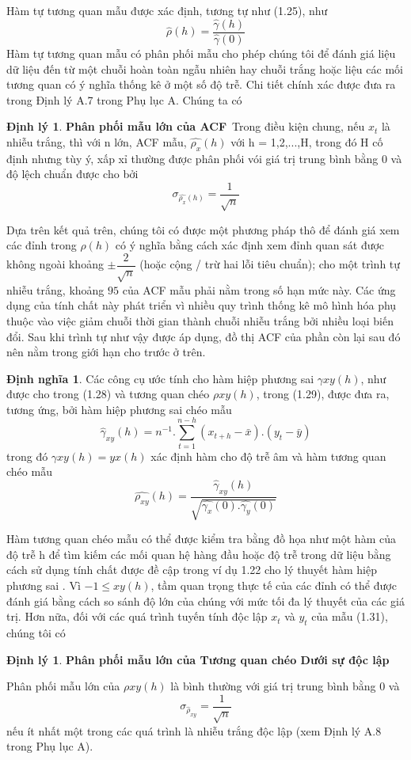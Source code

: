\documentclass[12pt, a4paper,oneside]{book}
\theoremstyle{definition}
\newtheorem{dn}[theo]{Định nghĩa}
\newtheorem{dl}[theo]{Định lý}
\begin{document}
Hàm tự tương quan mẫu được xác định, tương tự như (1.25), như $$\hat{\rho}(h)=\dfrac{\hat{\gamma}(h)}{\hat{\gamma}(0)}$$
Hàm tự tương quan mẫu có phân phối mẫu cho phép chúng tôi để đánh giá liệu dữ liệu đến từ một chuỗi hoàn toàn ngẫu nhiên hay chuỗi trắng hoặc liệu các mối tương quan có ý nghĩa thống kê ở một số độ trễ. Chi tiết chính xác được đưa ra trong Định lý A.7 trong Phụ lục A. Chúng ta có 
\begin{dl}
\textbf{Phân phối mẫu lớn của ACF}\
Trong điều kiện chung, nếu $ x_{t}$ là nhiễu trắng, thì với n lớn, ACF mẫu, $\hat{\rho_{x}}(h)$ với h = 1,2,...,H, trong đó H cố định nhưng tùy ý, xấp xỉ thường được phân phối vói giá trị trung bình bằng 0 và độ lệch chuẩn được cho bởi
$$\sigma_{\hat{\rho_{x}}(h)}=\dfrac{1}{\sqrt{n}}$$
\end{dl}
Dựa trên kết quả trên, chúng tôi có được một phương pháp thô để đánh giá xem
các đỉnh trong $\rho(h)$ có ý nghĩa bằng cách xác định xem đỉnh quan sát được không ngoài khoảng $\pm\dfrac{2}{\sqrt{n}}$ (hoặc cộng / trừ hai lỗi tiêu chuẩn); cho một trình tự nhiễu trắng, khoảng $95$ của  ACF mẫu phải nằm trong số hạn mức này. Các ứng dụng của tính chất này phát triển vì nhiều quy trình thống kê mô hình hóa phụ thuộc vào việc giảm chuỗi thời gian thành chuỗi nhiễu trắng bởi nhiều loại biến đổi. Sau khi trình tự như vậy được áp dụng, đồ thị  ACF của phần còn lại sau đó nên nằm trong giới hạn cho trước ở trên.
\begin{dn}
Các công cụ ước tính cho hàm hiệp phương sai $\gamma xy(h)$, như được cho trong (1.28) và tương quan chéo $\rho xy(h)$, trong (1.29), được đưa ra, tương ứng, bởi hàm hiệp phương sai chéo mẫu $$\hat{\gamma}_{xy}(h)= n^{-1}.\sum _ {t = 1 } ^ {n-h} (x_{t+h}-\bar{x}).(y_{t}-\bar{y})$$
trong đó $\gamma xy(h)= yx(h)$ xác định hàm cho độ trễ âm và hàm tương quan chéo mẫu $$\hat{\rho_{xy}}(h)= \dfrac{\hat{\gamma}_{xy}(h)}{\sqrt{\hat{\gamma_{x}}(0).\hat{\gamma_{y}}(0)}}$$
\end{dn}
Hàm tương quan chéo mẫu có thể được kiểm tra bằng đồ họa như một hàm của độ trễ h để tìm kiếm các mối quan hệ hàng đầu hoặc độ trễ trong dữ liệu bằng cách sử dụng tính chất được đề cập trong ví dụ 1.22 cho lý thuyết hàm hiệp phương sai . Vì $-1\leqslant xy(h)$, tầm quan trọng thực tế của các đỉnh có thể được đánh giá bằng cách so sánh độ lớn của chúng với mức tối đa lý thuyết của các giá trị. Hơn nữa, đối với các quá trình tuyến tính độc lập $x_{t}$ và $y_{t}$ của mẫu (1.31), chúng tôi có 
\begin{dl}
\textbf{Phân phối mẫu lớn của Tương quan chéo Dưới sự độc lập}\
	
Phân phối mẫu lớn của $\rho xy(h)$ là bình thường với giá trị trung bình bằng 0 và $$\sigma_{\hat{\rho}_{xy}}=\dfrac{1}{\sqrt{n}}$$
nếu ít nhất một trong các quá trình là nhiễu trắng độc lập (xem Định lý A.8 trong Phụ lục A).
\end{dl}
\end{document}
